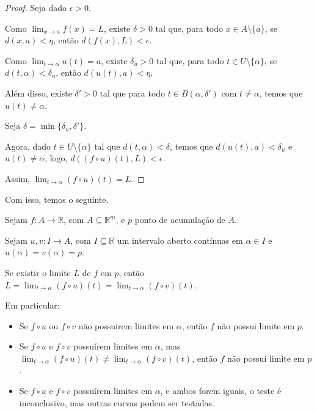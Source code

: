 \begin{proof}
    Seja dado $\epsilon>0$.

    Como $\lim_{x\to a} f(x) = L$, existe $\delta>0$ tal que, para todo $x \in A\setminus\{a\}$, se $d(x, a) < \eta$, então $d(f(x), L) < \epsilon$.

    Como $\lim_{t\to \alpha} u(t) = a$, existe $\delta_u>0$ tal que, para todo $t \in U\setminus\{\alpha\}$, se $d(t, \alpha) < \delta_u$, então $d(u(t), a) < \eta$.

   Além disso, existe $\delta'>0$ tal que para todo $t \in B(\alpha, \delta')$ com $t\neq \alpha$, temos que $u(t)\neq \alpha$.

    Seja $\delta = \min\{\delta_u, \delta'\}$.

    Agora, dado $t \in U\setminus\{\alpha\}$ tal que $d(t, \alpha) < \delta$, temos que $d(u(t), a) < \delta_u$ e $u(t)\neq \alpha$, logo, $d((f\circ u)(t), L) < \epsilon$.

    Assim, $\lim_{t\to \alpha} (f\circ u)(t) = L$.
\end{proof}

Com isso, temos o seguinte.

\begin{corollary}
    Sejam $f: A \rightarrow \mathbb R$, com $A\subseteq \mathbb R^m$, e $p$ ponto de acumulação de $A$.

    Sejam $u, v: I\rightarrow A$, com $I\subseteq \mathbb R$ um intervalo aberto contínuas em $\alpha \in I$ e $u(\alpha) = v(\alpha) = p$.

    Se existir o limite $L$ de $f$ em $p$, então $L=\lim_{t\to \alpha} (f\circ u)(t) = \lim_{t\to \alpha} (f\circ v)(t)$.

    Em particular:

    \begin{itemize}
        \item Se $f\circ u$ ou $f\circ v$ não possuirem limites em $\alpha$, então $f$ não possui limite em $p$.
        \item Se $f\circ u$ e $f\circ v$ possuírem limites em $\alpha$, mas $\lim_{t\to \alpha} (f\circ u)(t) \neq \lim_{t\to \alpha} (f\circ v)(t)$, então $f$ não possui limite em $p$.
        \item Se $f\circ u$ e $f\circ v$ possuírem limites em $\alpha$, e ambos forem iguais, o teste é inconclusivo, mas outras curvas podem ser testadas.
    \end{itemize}
\end{corollary}